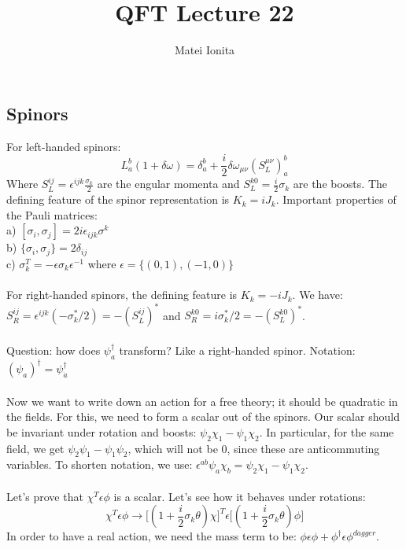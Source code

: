\documentclass[12 pt]{article}
\title{QFT Lecture 22}
\author{Matei Ionita}
\begin{document}
  \maketitle

\subsection*{Spinors}
For left-handed spinors:
\[    L_a^b (1 + \delta \omega) = \delta_a^b + \frac{i}{2} \delta \omega_{\mu \nu} (S_L^{\mu\nu})_a^b    \]
Where $ S_L^{ij} = \epsilon^{ijk} \frac{\sigma_k}{2} $ are the engular momenta and $S_L^{k0} = \frac{i}{2} \sigma_k$ are the boosts. The defining feature of the spinor representation is $K_k = iJ_k$. Important properties of the Pauli matrices:
\\
a) $[\sigma_i , \sigma_j] = 2i \epsilon_{ijk} \sigma^k$
\\
b) $\{\sigma_i , \sigma_j\} = 2\delta_{ij} $
\\
c) $ \sigma_k^T = - \epsilon \sigma_k \epsilon^{-1} $ where $\epsilon = \{ (0,1) , (-1, 0)  \} $
\\
\\
For right-handed spinors, the defining feature is $K_k = -iJ_k$. We have: $S_R^{ij} = \epsilon^{ijk} (- \sigma_k^*/2) = -(S_L^{ij})^*$ and $S_R^{k0} = i \sigma^*_k /2 = - (S_L^{k0})^*$.
\\
\\
Question: how does $\psi_a^{\dagger}$ transform? Like a right-handed spinor. Notation: $(\psi_a)^{\dagger} = \psi^{\dagger}_{\dot a}$
\\
\\
Now we want to write down an action for a free theory; it should be quadratic in the fields. For this, we need to form a scalar out of the spinors. Our scalar should be invariant under rotation and boosts: $\psi_2 \chi_1 - \psi_1 \chi_2$. In particular, for the same field, we get $\psi_2 \psi_1 - \psi_1 \psi_2$, which will not be 0, since these are anticommuting variables. To shorten notation, we use: $\epsilon^{ab} \psi_a \chi_b = \psi_2 \chi_1 - \psi_1 \chi_2$.
\\
\\
Let's prove that $\chi^T \epsilon \phi$ is a scalar. Let's see how it behaves under rotations:
\[     \chi^T \epsilon \phi \to \big[  (1+ \frac{i}{2} \sigma_k \theta)\chi  \big]^T \epsilon \big[(1+\frac{i}{2} \sigma_k \theta)\phi \big]     \]
In order to have a real action, we need the mass term to be: $\phi \epsilon \phi + \phi^{\dagger} \epsilon \phi^{dagger}$.
\\
\end{document}
